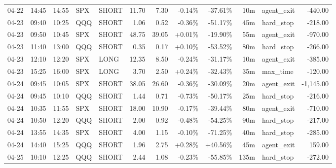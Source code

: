 \documentclass[11pt,a4paper,twoside]{article}
\begin{document}
\begin{center}
\begin{longtable}{>{\color{txtmain}}l l l l l r r r r r >{\color{txtmain}}l r}
04-22 & 14:45 & 14:55 & SPX & SHORT & 11.70 & 7.30 & \textcolor{lossred}{-0.14\%} & \textcolor{lossred}{-37.61\%} & 10m & agent\_exit & \textcolor{lossred}{-440.00} \\
04-23 & 09:40 & 10:25 & QQQ & SHORT & 1.06 & 0.52 & \textcolor{lossred}{-0.36\%} & \textcolor{lossred}{-51.17\%} & 45m & hard\_stop & \textcolor{lossred}{-218.00} \\
04-23 & 09:50 & 10:45 & SPX & SHORT & 48.75 & 39.05 & \textcolor{wingreen}{+0.01\%} & \textcolor{lossred}{-19.90\%} & 55m & agent\_exit & \textcolor{lossred}{-970.00} \\
04-23 & 11:40 & 13:00 & QQQ & SHORT & 0.35 & 0.17 & \textcolor{wingreen}{+0.10\%} & \textcolor{lossred}{-53.52\%} & 80m & hard\_stop & \textcolor{lossred}{-266.00} \\
04-23 & 12:10 & 12:20 & SPX & LONG & 12.35 & 8.50 & \textcolor{lossred}{-0.24\%} & \textcolor{lossred}{-31.17\%} & 10m & agent\_exit & \textcolor{lossred}{-385.00} \\
04-23 & 15:25 & 16:00 & SPX & LONG & 3.70 & 2.50 & \textcolor{wingreen}{+0.24\%} & \textcolor{lossred}{-32.43\%} & 35m & max\_time & \textcolor{lossred}{-120.00} \\
04-24 & 09:45 & 10:05 & SPX & SHORT & 38.05 & 26.60 & \textcolor{lossred}{-0.36\%} & \textcolor{lossred}{-30.09\%} & 20m & agent\_exit & \textcolor{lossred}{-1,145.00} \\
04-24 & 09:45 & 10:10 & QQQ & SHORT & 1.44 & 0.71 & \textcolor{lossred}{-0.73\%} & \textcolor{lossred}{-50.17\%} & 25m & hard\_stop & \textcolor{lossred}{-216.00} \\
04-24 & 10:35 & 11:55 & SPX & SHORT & 18.00 & 10.90 & \textcolor{lossred}{-0.17\%} & \textcolor{lossred}{-39.44\%} & 80m & agent\_exit & \textcolor{lossred}{-710.00} \\
04-24 & 10:50 & 12:20 & QQQ & SHORT & 2.00 & 0.92 & \textcolor{lossred}{-0.48\%} & \textcolor{lossred}{-54.25\%} & 90m & hard\_stop & \textcolor{lossred}{-217.00} \\
04-24 & 13:55 & 14:35 & SPX & SHORT & 4.00 & 1.15 & \textcolor{lossred}{-0.10\%} & \textcolor{lossred}{-71.25\%} & 40m & hard\_stop & \textcolor{lossred}{-285.00} \\
04-24 & 14:40 & 15:25 & QQQ & SHORT & 1.96 & 2.75 & \textcolor{wingreen}{+0.28\%} & \textcolor{wingreen}{+40.56\%} & 45m & agent\_exit & \textcolor{wingreen}{159.00} \\
04-25 & 10:10 & 12:25 & QQQ & SHORT & 2.44 & 1.08 & \textcolor{lossred}{-0.23\%} & \textcolor{lossred}{-55.85\%} & 135m & hard\_stop & \textcolor{lossred}{-272.00} \\

\end{longtable}
\end{center}
\end{document}
